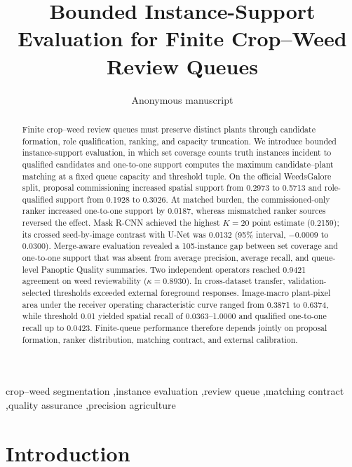 \documentclass[preprint,12pt]{elsarticle}
\begin{document}
\raggedbottom
\begin{frontmatter}

\title{Bounded Instance-Support Evaluation for Finite Crop--Weed Review Queues}
\ifAuthorMetadataReady
\AuthorFrontmatter
\else
\author{Anonymous manuscript}
\address{Author identities and affiliations are withheld for blinded review.}
\fi

\begin{abstract}
Finite crop--weed review queues must preserve distinct plants through candidate formation, role qualification, ranking, and capacity truncation. We introduce bounded instance-support evaluation, in which set coverage counts truth instances incident to qualified candidates and one-to-one support computes the maximum candidate--plant matching at a fixed queue capacity and threshold tuple. On the official WeedsGalore split, proposal commissioning increased spatial support from 0.2973 to 0.5713 and role-qualified support from 0.1928 to 0.3026. At matched burden, the commissioned-only ranker increased one-to-one support by 0.0187, whereas mismatched ranker sources reversed the effect. Mask R-CNN achieved the highest $K=20$ point estimate (0.2159); its crossed seed-by-image contrast with U-Net was 0.0132 (95\% interval, $-0.0009$ to 0.0300). Merge-aware evaluation revealed a 105-instance gap between set coverage and one-to-one support that was absent from average precision, average recall, and queue-level Panoptic Quality summaries. Two independent operators reached 0.9421 agreement on weed reviewability ($\kappa=0.8930$). In cross-dataset transfer, validation-selected thresholds exceeded external foreground responses. Image-macro plant-pixel area under the receiver operating characteristic curve ranged from 0.3871 to 0.6374, while threshold 0.01 yielded spatial recall of 0.0363--1.0000 and qualified one-to-one recall up to 0.0423. Finite-queue performance therefore depends jointly on proposal formation, ranker distribution, matching contract, and external calibration.
\end{abstract}

\begin{keyword}
crop--weed segmentation \sep instance evaluation \sep review queue \sep matching contract \sep quality assurance \sep precision agriculture
\end{keyword}
\end{frontmatter}

\section{Introduction}
\end{document}
